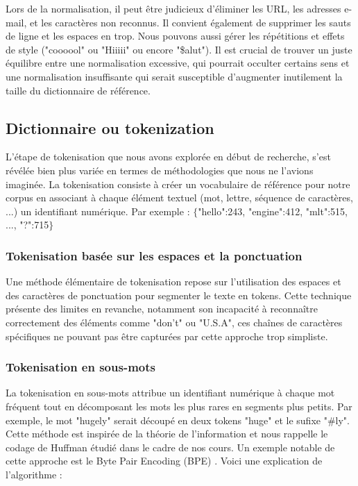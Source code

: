 \documentclass[12pt]{article}
\theoremstyle{definition}
\begin{document}
	 Lors de la normalisation, il peut être judicieux d'éliminer les URL, les adresses e-mail, et les caractères non reconnus. Il convient également de supprimer les sauts de ligne et les espaces en trop. Nous pouvons aussi gérer les répétitions et effets de style ("coooool" ou "Hiiiii" ou encore "\$alut"). Il est crucial de trouver un juste équilibre entre une normalisation excessive, qui pourrait occulter certains sens et une normalisation insuffisante qui serait susceptible d'augmenter inutilement la taille du dictionnaire de référence.
	\subsection{Dictionnaire ou tokenization}
	
	L'étape de tokenisation que nous avons explorée en début de recherche, s'est révélée bien plus variée en termes de méthodologies que nous ne l'avions imaginée. La tokenisation consiste à créer un vocabulaire de référence pour notre corpus en associant à chaque élément textuel (mot, lettre, séquence de caractères, ...) un identifiant numérique. Par exemple : $\{$"hello":243, "engine":412, "mlt":515, ..., "?":715$\}$ 
	

	\subsubsection{Tokenisation basée sur les espaces et la ponctuation}
	Une méthode élémentaire de tokenisation repose sur l'utilisation des espaces et des caractères de ponctuation pour segmenter le texte en tokens. Cette technique présente des limites en revanche, notamment son incapacité à reconnaître correctement des éléments comme "don't" ou "U.S.A", ces chaînes de caractères spécifiques ne pouvant pas être capturées par cette approche trop simpliste.
	
	\subsubsection{Tokenisation en sous-mots}
	
	La tokenisation en sous-mots attribue un identifiant numérique à chaque mot fréquent tout en décomposant les mots les plus rares en segments plus petits. Par exemple, le mot "hugely" serait découpé en deux tokens "huge" et le sufixe "\#ly". Cette méthode est inspirée de la théorie de l'information et nous rappelle le codage de Huffman étudié dans le cadre de nos cours. Un exemple notable de cette approche est le Byte Pair Encoding (BPE) \cite{BPE}. Voici une explication de l'algorithme : 
	
\end{document}
